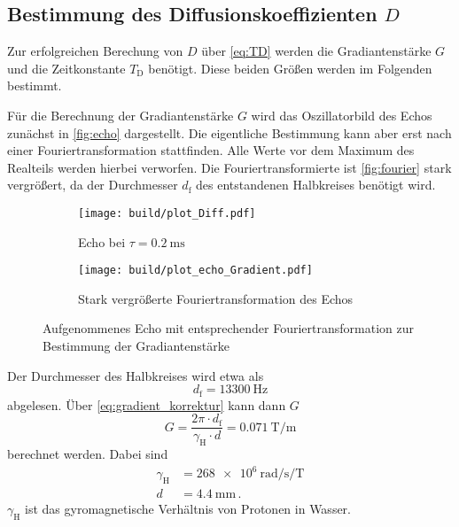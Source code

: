 \subsection{Bestimmung des Diffusionskoeffizienten \texorpdfstring{$D$}{D}}
\label{ssec:aus3}

Zur erfolgreichen Berechung von $D$ über \autoref{eq:TD} werden die Gradiantenstärke $G$ und die Zeitkonstante $T_\text{D}$ benötigt. 
Diese beiden Größen werden im Folgenden bestimmt.

Für die Berechnung der Gradiantenstärke $G$ wird das Oszillatorbild des Echos zunächst in \autoref{fig:echo} dargestellt.
Die eigentliche Bestimmung kann aber erst nach einer Fouriertransformation stattfinden. 
Alle Werte vor dem Maximum des Realteils werden hierbei verworfen.
Die Fouriertransformierte ist \autoref{fig:fourier} stark vergrößert, da der Durchmesser $d_\text{f}$ des entstandenen Halbkreises benötigt wird.

\begin{figure}
    \centering
    \begin{subfigure}{0.4\textwidth}
        \centering
        \texttt{[image: build/plot\_Diff.pdf]}
        \caption{Echo bei $\tau = \SI{0.2}{\milli\second}$}
        \label{fig:echo}
    \end{subfigure}
    \begin{subfigure}{0.4\textwidth}
        \centering
        \texttt{[image: build/plot\_echo\_Gradient.pdf]}
        \caption{Stark vergrößerte Fouriertransformation des Echos}
        \label{fig:fourier}
    \end{subfigure}
    \caption{Aufgenommenes Echo mit entsprechender Fouriertransformation zur Bestimmung der Gradiantenstärke}
    \label{fig:g_messung}
\end{figure}

Der Durchmesser des Halbkreises wird etwa als 
\begin{equation*}
    d_\text{f} = \SI{13300}{\hertz} 
    \label{eq:df}
\end{equation*}
abgelesen.
Über \autoref{eq:gradient_korrektur} kann dann $G$ 
\begin{equation}
    G = \frac{2 \pi \cdot d_\text{f}}{\gamma _\text{H} \cdot d} = \SI{0.071}{\tesla\per\meter}
    \label{eq:g_wert}
\end{equation}
berechnet werden.
Dabei sind
\begin{align*}
    \gamma _\text{H} &=  \SI{268e6}{\radian\per\second\per\tesla} \\
    d &=  \SI{4.4}{\milli\meter} \, . 
\end{align*}
$\gamma _\text{H}$ ist das gyromagnetische Verhältnis von Protonen in Wasser. \cite{physics_constants}

